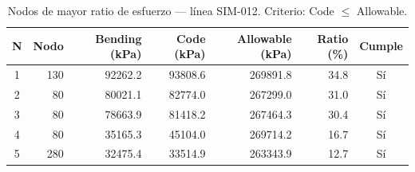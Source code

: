 \begin{table}[htbp]
  \centering
  \small
  \caption{Nodos de mayor ratio de esfuerzo — línea SIM-012. Criterio: Code $\leq$ Allowable.}
  \label{tab:top5-ratio}
  \begin{tabular}{crrrrrc}
    \toprule
    N & Nodo & Bending (\si{kPa}) & Code (\si{kPa}) & Allowable (\si{kPa}) & Ratio (\%) & Cumple \\
    \midrule
    1 & 130 & \num{92262.2} & \num{93808.6} & \num{269891.8} & 34.8 & Sí \\
    2 & 80 & \num{80021.1} & \num{82774.0} & \num{267299.0} & 31.0 & Sí \\
    3 & 80 & \num{78663.9} & \num{81418.2} & \num{267464.3} & 30.4 & Sí \\
    4 & 80 & \num{35165.3} & \num{45104.0} & \num{269714.2} & 16.7 & Sí \\
    5 & 280 & \num{32475.4} & \num{33514.9} & \num{263343.9} & 12.7 & Sí \\
    \bottomrule
  \end{tabular}
\end{table}
